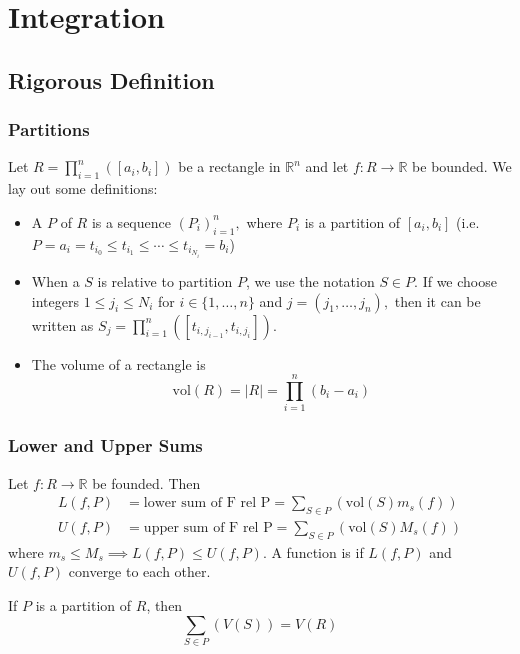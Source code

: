 \documentclass{article}
\numberwithin{equation}{section}
\begin{document}
\newpage
\section{Integration}
\subsection{Rigorous Definition}
\subsubsection{Partitions}
Let $R = \prod_{i=1}^n\left([a_i,b_i]\right)$ be a rectangle in $\mathbb{R}^n$ and let $f:R\to\mathbb{R}$ be bounded. We lay out some definitions:
\begin{itemize}
    \item A  $P$ of $R$ is a sequence $(P_i)^n_{i=1},$ where $P_i$ is a partition of $[a_i,b_i]$ (i.e. $P=a_i=t_{i_0}\le t_{i_1}\le \cdots \le t_{i_{N_i}}=b_i$)
    \item When a  $S$ is relative to partition $P$, we use the notation $S \in P$. If we choose integers $1\le j_i \le N_i$ for $i\in \{1,\dots,n\}$ and $j=(j_1,\dots,j_n),$ then it can be written as $S_j = \prod_{i=1}^n([t_{i,j_{i-1}},t_{i,j_i}])$.
    \item The volume of a rectangle is
    \begin{equation}
        \text{vol}(R) = |R| = \prod_{i=1}^n(b_i-a_i)
    \end{equation}
\end{itemize}
\subsubsection{Lower and Upper Sums}
Let $f:R\to \mathbb{R}$ be founded. Then
\begin{align}
    L(f,P) &= \text{lower sum of F rel P} = \sum_{S \in P}(\text{vol}(S) m_s(f)) \\ 
    U(f,P) &= \text{upper sum of F rel P} = \sum_{S \in P}(\text{vol}(S) M_s(f))
\end{align}
where $m_s \le M_s \implies L(f,P) \le U(f,P)$. A function is  if $L(f,P)$ and $U(f,P)$ converge to each other.
\begin{lemma}
    If $P$ is a partition of $R$, then
    \begin{equation}
        \sum_{S\in P}(V(S)) = V(R)
    \end{equation}
\end{lemma}
\end{document}
